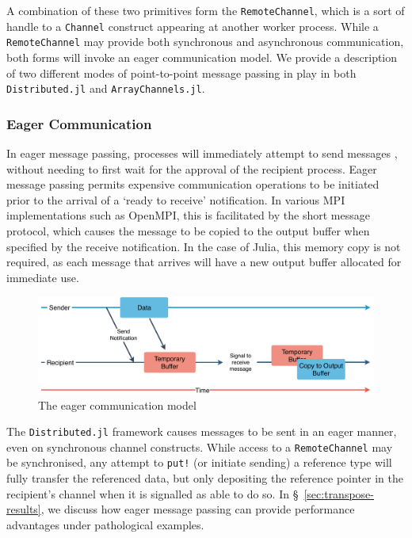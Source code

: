 \documentclass{juliacon}
\begin{document}
A combination of these two primitives form the \texttt{RemoteChannel},
which is a sort of handle to a \texttt{Channel} construct appearing at
another worker process. While a \texttt{RemoteChannel} may provide both
synchronous and asynchronous communication, both forms will invoke an
eager communication model. We provide a description of two different
modes of point-to-point message passing in play in both
\texttt{Distributed.jl} and \texttt{ArrayChannels.jl}.

\subsubsection{Eager Communication}
\label{sec:eager}

In eager message passing, processes will immediately attempt to send
messages \cite{illinois, ompi}, without needing to first wait for the
approval of the recipient process. Eager message passing permits expensive
communication operations to be initiated prior to the arrival of a
`ready to receive' notification. In various MPI implementations such as
OpenMPI, this is facilitated by the short message protocol, which causes
the message to be copied to the output buffer when specified by the
receive notification. In the case of Julia, this memory copy is not
required, as each message that arrives will have a new output buffer
allocated for immediate use.

\begin{figure}[htb]
	\includegraphics[width=\linewidth]{figs/Eager.pdf}
	\caption{The eager communication model}
	\label{fig:eager}
\end{figure}

The \texttt{Distributed.jl} framework causes messages to be sent in an
eager manner, even on synchronous channel constructs. While access to a
\texttt{RemoteChannel} may be synchronised, any attempt to \texttt{put!}
(or initiate sending) a reference type will fully transfer the
referenced data, but only depositing the reference pointer in the
recipient's channel when it is signalled as able to do so. In
\S~\ref{sec:transpose-results}, we discuss how eager message
passing can provide performance advantages under pathological examples.
\end{document}
